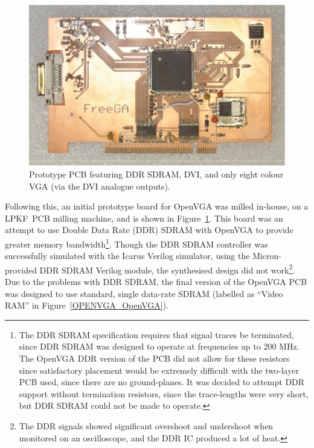 \begin{figure}[h]
\begin{center}
\includegraphics[width=\linewidth]{images/FreeGA_orig.jpeg}
\caption[OpenVGA PCB version 2 with DDR SDRAM]{Prototype PCB featuring DDR
SDRAM, DVI, and only eight colour VGA (via the DVI analogue outputs).}
\label{OPENVGA_Version2}
\end{center}
\end{figure}

Following this, an initial prototype board for OpenVGA was milled in-house, on a
LPKF\texttrademark~PCB milling machine, and is shown in
Figure~\ref{OPENVGA_Version2}. This board was an attempt to use Double Data
Rate (DDR) SDRAM with
OpenVGA to provide greater memory bandwidth\footnote{The DDR SDRAM specification
requires that signal traces be terminated, since DDR SDRAM was designed to
operate at frequencies up to 200 MHz. The OpenVGA DDR version of the PCB did not
allow for these resistors since satisfactory placement would be extremely
difficult with the two-layer PCB used, since there are no ground-planes. It was
decided to attempt DDR support without termination resistors, since the
trace-lengths were very short, but DDR SDRAM could not be made to operate.}.
Though the DDR SDRAM controller was successfully simulated with the Icarus
Verilog simulator, using the Micron-provided DDR SDRAM Verilog module, the
synthesised design did not work\footnote{The DDR signals showed significant
overshoot and undershoot when monitored on an oscilloscope, and the DDR IC
produced a lot of heat.}. Due to the problems with DDR SDRAM, the final version
of the OpenVGA PCB was designed to use standard, single data-rate SDRAM (labelled
as ``Video RAM'' in Figure~\ref{OPENVGA_OpenVGA}).



